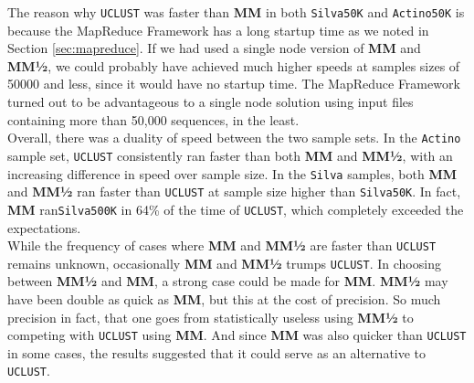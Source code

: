 \documentclass[../../main.tex]{subfiles}
\begin{document}
The reason why {\tt UCLUST} was faster than {\bf MM} in both {\tt Silva50K} and {\tt Actino50K} is because the MapReduce Framework has a long startup time as we noted in Section \ref{sec:mapreduce}. If we had used a single node version of {\bf MM} and {\bf MM½}, we could probably have achieved much higher speeds at samples sizes of 50000 and less, since it would have no startup time. The MapReduce Framework turned out to be advantageous to a single node solution using input files containing more than 50,000 sequences, in the least.\\

Overall, there was a duality of speed between the two sample sets. In the \texttt{Actino} sample set, \texttt{UCLUST} consistently ran faster than both {\bf MM} and {\bf MM½}, with an increasing difference in speed over sample size. In the \texttt{Silva} samples, both {\bf MM} and {\bf MM½} ran faster than \texttt{UCLUST} at sample size higher than {\tt Silva50K}. In fact, {\bf MM} ran\texttt{Silva500K} in 64\% of the time of \texttt{UCLUST}, which completely exceeded the expectations.\\

While the frequency of cases where {\bf MM} and {\bf MM½} are faster than {\tt UCLUST} remains unknown, occasionally {\bf MM} and {\bf MM½} trumps \texttt{UCLUST}. In choosing between {\bf MM½} and {\bf MM}, a strong case could be made for {\bf MM}. {\bf MM½} may have been double as quick as {\bf MM}, but this at the cost of precision. So much precision in fact, that one goes from statistically useless using {\bf MM½} to competing with \texttt{UCLUST} using {\bf MM}. And since {\bf MM} was also quicker than {\tt UCLUST} in some cases, the results suggested that it could serve as an alternative to \texttt{UCLUST}.\\
\end{document}
